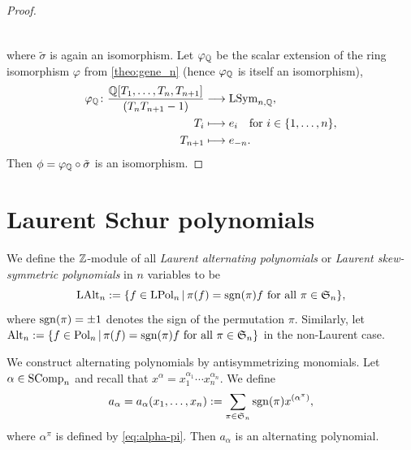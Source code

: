 \documentclass[11pt]{amsart}
\begin{document}
\begin{proof}
\[\begin{tikzcd}[row sep=large, column sep=large]
    \end{tikzcd}
    \]
    where \(\tilde{\sigma}\) is again an isomorphism. Let \(\varphi_{\mathbb{Q}}\) be the scalar extension of the ring isomorphism $\varphi$ from \cref{theo:gene_n} (hence $\varphi_{\mathbb{Q}}$ is itself an isomorphism), 
    \begin{align*}
        \varphi_{\mathbb{Q}} \colon \frac{\mathbb{Q}[T_1,\dots,T_n,T_{n + 1}]}{(T_n T_{n + 1} - 1)} &\longrightarrow \mathrm{LSym}_{n, \mathbb{Q}}, \\
        T_i &\longmapsto e_i \quad \text{for }i \in \{ 1,\dots,n\}, \\
        T_{n+1} &\longmapsto e_{-n}.
    \end{align*}
    Then \(\phi = \varphi_{\mathbb{Q}} \circ \tilde{\sigma}\) is an isomorphism.
\end{proof}

\section{Laurent Schur polynomials} \label{sec:lscp}
\begin{defin}\label{def:LAlt_n}
We define the $\mathbb{Z}$-module of all \emph{Laurent alternating polynomials} or \emph{Laurent skew-symmetric polynomials}  in $n$ variables to be
\[
\mathrm{LAlt}_n := \{ f \in \mathrm{LPol}_n\,|\, \pi(f) = \mathrm{sgn}(\pi)f \text{ for all } \pi \in \mathfrak{S}_n\},
\]
where \(\mathrm{sgn}(\pi) = \pm 1\) denotes the sign of the permutation \(\pi\). Similarly, let $\mathrm{Alt}_n := \{ f \in \mathrm{Pol}_n\,|\, \pi(f) = \mathrm{sgn}(\pi)f \text{ for all } \pi \in \mathfrak{S}_n\}$ in the non-Laurent case.
\end{defin}

We construct alternating polynomials by antisymmetrizing monomials. Let $\alpha \in \mathrm{SComp}_n$ and recall that $x^\alpha = x_1^{\alpha_1}\cdots x_n^{\alpha_n}$. We define
\begin{equation}\label{eq:aalpha}
      a_\alpha = a_\alpha(x_1,\dots, x_n) := \sum_{\pi \in\mathfrak{S}_n} \mathrm{sgn}(\pi) x^{(\alpha^\pi)},
\end{equation}
where $\alpha^\pi$ is defined by \cref{eq:alpha-pi}.  Then $a_\alpha$ is an alternating polynomial.
\end{document}
